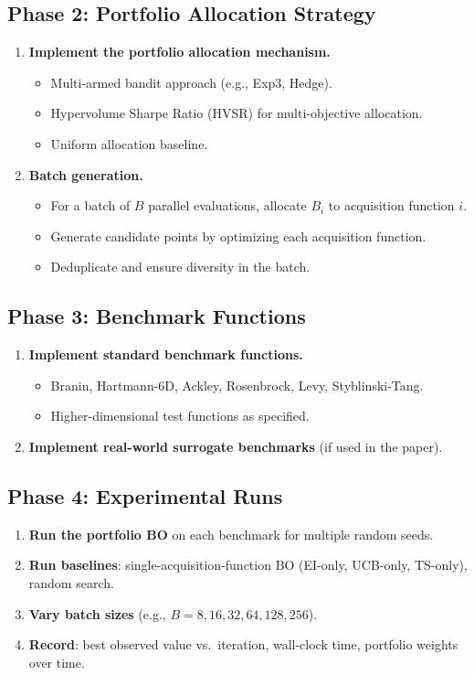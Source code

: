 \documentclass[11pt,a4paper]{article}
\begin{document}
\subsection{Phase 2: Portfolio Allocation Strategy}
\begin{enumerate}[label=\textbf{2.\arabic*}]
  \item \textbf{Implement the portfolio allocation mechanism.}
    \begin{itemize}
      \item Multi-armed bandit approach (e.g., Exp3, Hedge).
      \item Hypervolume Sharpe Ratio (HVSR) for multi-objective allocation.
      \item Uniform allocation baseline.
    \end{itemize}
  \item \textbf{Batch generation.}
    \begin{itemize}
      \item For a batch of $B$ parallel evaluations, allocate $B_i$ to acquisition function $i$.
      \item Generate candidate points by optimizing each acquisition function.
      \item Deduplicate and ensure diversity in the batch.
    \end{itemize}
\end{enumerate}

\subsection{Phase 3: Benchmark Functions}
\begin{enumerate}[label=\textbf{3.\arabic*}]
  \item \textbf{Implement standard benchmark functions.}
    \begin{itemize}
      \item Branin, Hartmann-6D, Ackley, Rosenbrock, Levy, Styblinski-Tang.
      \item Higher-dimensional test functions as specified.
    \end{itemize}
  \item \textbf{Implement real-world surrogate benchmarks} (if used in the paper).
\end{enumerate}

\subsection{Phase 4: Experimental Runs}
\begin{enumerate}[label=\textbf{4.\arabic*}]
  \item \textbf{Run the portfolio BO} on each benchmark for multiple random seeds.
  \item \textbf{Run baselines}: single-acquisition-function BO (EI-only, UCB-only, TS-only), random search.
  \item \textbf{Vary batch sizes} (e.g., $B = 8, 16, 32, 64, 128, 256$).
  \item \textbf{Record}: best observed value vs.\ iteration, wall-clock time, portfolio weights over time.
\end{enumerate}
\end{document}
